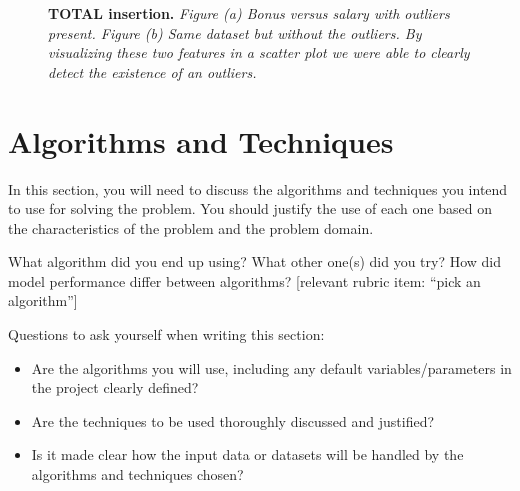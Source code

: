 \documentclass[twoside,openright,titlepage,numbers=noenddot,headinclude,%
               footinclude=true,cleardoublepage=empty,abstractoff,BCOR=5mm,%
               paper=a4,fontsize=11pt,ngerman,american]{scrreprt}
\numberwithin{theorem}{chapter}
\numberwithin{definition}{chapter}
\numberwithin{algorithm}{chapter}
\numberwithin{figure}{chapter}
\numberwithin{table}{chapter}
\numberwithin{equation}{chapter}
\begin{document}
\begin{itemize}
\begin{figure}[!hbtp]
\centering
    
    \caption{\textbf{TOTAL insertion.} \textit{Figure (a) Bonus versus salary with outliers present. Figure (b) Same dataset but without the outliers. By visualizing these two features in a scatter plot we were able to clearly detect the existence of an outliers.}}
\end{figure}


\section*{Algorithms and Techniques}

In this section, you will need to discuss the algorithms and techniques you intend to use for solving the problem. You should justify the use of each one based on the characteristics of the problem and the problem domain. 

What algorithm did you end up using? What other one(s) did you try? How did model performance differ between algorithms?  [relevant rubric item: ``pick an algorithm'']

Questions to ask yourself when writing this section:
\begin{itemize}%
\item Are the algorithms you will use, including any default variables/parameters in the project clearly defined?
\item Are the techniques to be used thoroughly discussed and justified?
\item Is it made clear how the input data or datasets will be handled by the algorithms and techniques chosen?
\end{itemize}


\end{itemize}
\end{document}
